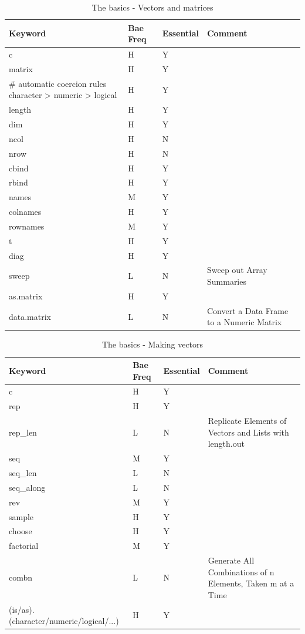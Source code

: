 \documentclass[10pt,]{krantz}
\theoremstyle{definition}
\theoremstyle{definition}
\theoremstyle{remark}
\begin{document}
\begin{table}

\caption{\label{tab:knitchunk7}The basics - Vectors and matrices}
\centering
\begin{tabular}[t]{llll}
\toprule
Keyword & Bae Freq & Essential & Comment\\
\midrule
c & H & Y & \\
matrix & H & Y & \\
\# automatic coercion rules character > numeric > logical & H & Y & \\
length & H & Y & \\
dim & H & Y & \\
\addlinespace
ncol & H & N & \\
nrow & H & N & \\
cbind & H & Y & \\
rbind & H & Y & \\
names & M & Y & \\
\addlinespace
colnames & H & Y & \\
rownames & M & Y & \\
t & H & Y & \\
diag & H & Y & \\
sweep & L & N & Sweep out Array Summaries\\
\addlinespace
as.matrix & H & Y & \\
data.matrix & L & N & Convert a Data Frame to a Numeric Matrix\\
\bottomrule
\end{tabular}
\end{table}

\begin{table}

\caption{\label{tab:knitchunk8}The basics - Making vectors }
\centering
\begin{tabular}[t]{llll}
\toprule
Keyword & Bae Freq & Essential & Comment\\
\midrule
c & H & Y & \\
rep & H & Y & \\
rep\_len & L & N & Replicate Elements of Vectors and Lists with length.out\\
seq & M & Y & \\
seq\_len & L & N & \\
\addlinespace
seq\_along & L & N & \\
rev & M & Y & \\
sample & H & Y & \\
choose & H & Y & \\
factorial & M & Y & \\
\addlinespace
combn & L & N & Generate All Combinations of n Elements, Taken m at a Time\\
(is/as).(character/numeric/logical/...) & H & Y & \\
\bottomrule
\end{tabular}
\end{table}
\end{document}

